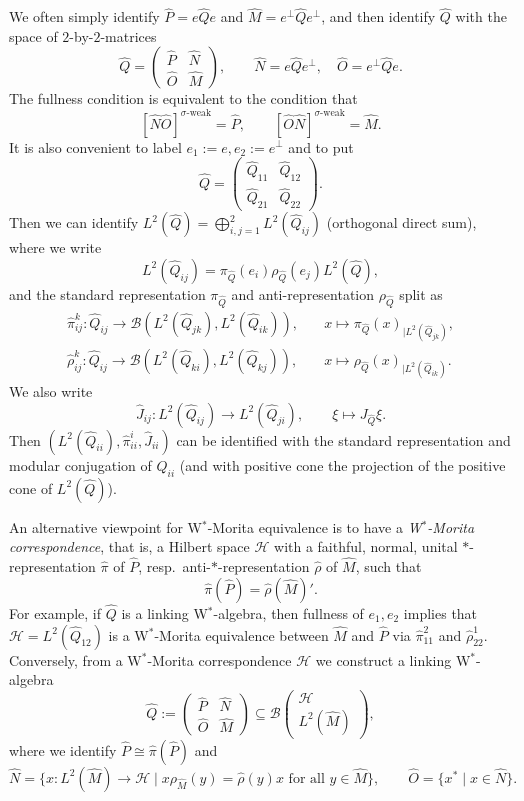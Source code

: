 \documentclass[reqno]{amsart}
\numberwithin{equation}{section}
\newcommand{\mcB}{\mathcal{B}}
\newcommand{\Hsp}{\mathcal{H}}
\begin{document}
We often simply identify $\hat{P} = e\hat{Q}e$ and $\hat{M} = e^{\perp}\hat{Q}e^{\perp}$, and then identify $\hat{Q}$ with the space of $2$-by-$2$-matrices
\[
\hat{Q} = \begin{pmatrix} \hat{P} & \hat{N} \\ \hat{O} & \hat{M} \end{pmatrix},\qquad \hat{N} = e\hat{Q}e^{\perp},\quad \hat{O} = e^{\perp}\hat{Q}e. 
\]
The fullness condition is  equivalent to the condition that 
\[
[\hat{N}\hat{O}]^{\sigma\textrm{-weak}} = \hat{P},\qquad [\hat{O}\hat{N}]^{\sigma\textrm{-weak}} = \hat{M}. 
\]
It is also convenient to label $e_1 := e, e_2:=e^{\perp}$ and to put 
\[
\hat{Q} = \begin{pmatrix} \hat{Q}_{11} & \hat{Q}_{12} \\ \hat{Q}_{21} & \hat{Q}_{22}\end{pmatrix}.
\]
Then we can identify $L^2(\hat{Q}) = \bigoplus_{i,j=1}^2 L^2(\hat{Q}_{ij})$ (orthogonal direct sum), where we write
\[
L^2(\hat{Q}_{ij}) = \pi_{\hat{Q}}(e_i)\rho_{\hat{Q}}(e_j) L^2(\hat{Q}), 
\]
and the standard representation $\pi_{\hat{Q}}$ and anti-representation $\rho_{\hat{Q}}$ split as
\[\begin{split}
\hat{\pi}_{ij}^k\colon \hat{Q}_{ij} \rightarrow \mcB(L^2(\hat{Q}_{jk}),L^2(\hat{Q}_{ik})),&\quad x\mapsto \pi_{\hat{Q}}(x)_{\mid L^2(\hat{Q}_{jk})}, \\
\hat{\rho}_{ij}^k\colon \hat{Q}_{ij} \rightarrow \mcB(L^2(\hat{Q}_{ki}),L^2(\hat{Q}_{kj})),&\quad x\mapsto \rho_{\hat{Q}}(x)_{\mid L^2(\hat{Q}_{ik})}. 
\end{split}\]
We also write
\[
\hat{J}_{ij}\colon L^2(\hat{Q}_{ij})\rightarrow L^2(\hat{Q}_{ji}),\qquad \xi \mapsto J_{\hat{Q}}\xi.
\]
Then $(L^2(\hat{Q}_{ii}),\hat{\pi}_{ii}^i,\hat{J}_{ii})$ can be identified with the standard representation and modular conjugation of $\hat{Q}_{ii}$ (and with positive cone the projection of the positive cone of $L^2(\hat{Q})$).

An alternative viewpoint for W$^*$-Morita equivalence is to have a \emph{W$^*$-Morita correspondence}, that is, a Hilbert space $\Hsp$ with a faithful, normal, unital $*$-representation $\hat{\pi}$ of $\hat{P}$, resp.~anti-$*$-representation $\hat{\rho}$ of $\hat{M}$, such that 
\[
\hat{\pi}(\hat{P}) = \hat{\rho}(\hat{M})'. 
\]
For example, if $\hat{Q}$ is a linking W$^*$-algebra, then fullness of $e_1,e_2$ implies that $\Hsp = L^2(\hat{Q}_{12})$ is a W$^*$-Morita equivalence between $\hat{M}$ and $\hat{P}$ via $\hat{\pi}_{11}^2$ and $\hat{\rho}_{22}^1$. Conversely, from a W$^*$-Morita correspondence $\Hsp$ we construct a linking W$^*$-algebra 
\[
\hat{Q} :=  \begin{pmatrix} \hat{P} & \hat{N} \\ \hat{O} & \hat{M} \end{pmatrix} \subseteq \mcB\begin{pmatrix} \Hsp \\L^2(\hat{M})\end{pmatrix},
\]
where we identify $\hat{P}\cong \hat{\pi}(\hat{P})$ and
\[
\hat{N} = \{x\colon  L^2(\hat{M}) \rightarrow \Hsp\mid x\rho_{\hat{M}}(y) = \hat{\rho}(y)x\textrm{ for all }y\in \hat{M}\},\qquad \hat{O} = \{x^*\mid x\in \hat{N}\}.
\]
\end{document}
